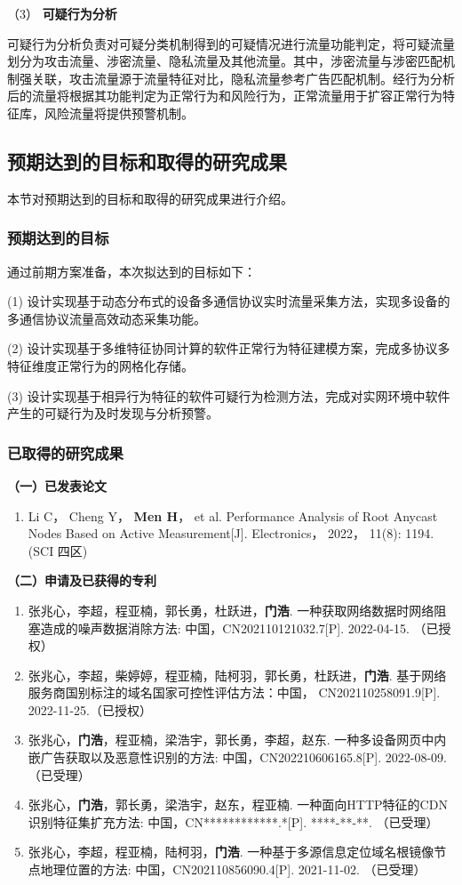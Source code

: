 （3） \textbf{可疑行为分析}\quad

可疑行为分析负责对可疑分类机制得到的可疑情况进行流量功能判定，将可疑流量划分为攻击流量、涉密流量、隐私流量及其他流量。其中，涉密流量与涉密匹配机制强关联，攻击流量源于流量特征对比，隐私流量参考广告匹配机制。经行为分析后的流量将根据其功能判定为正常行为和风险行为，正常流量用于扩容正常行为特征库，风险流量将提供预警机制。

\FloatBarrier
\subsection{预期达到的目标和取得的研究成果}
本节对预期达到的目标和取得的研究成果进行介绍。
\subsubsection{预期达到的目标}

通过前期方案准备，本次拟达到的目标如下：

(1) 设计实现基于动态分布式的设备多通信协议实时流量采集方法，实现多设备的多通信协议流量高效动态采集功能。

(2) 设计实现基于多维特征协同计算的软件正常行为特征建模方案，完成多协议多特征维度正常行为的网格化存储。

(3) 设计实现基于相异行为特征的软件可疑行为检测方法，完成对实网环境中软件产生的可疑行为及时发现与分析预警。

\subsubsection{已取得的研究成果}

	\noindent\textbf{（一）已发表论文}
	\begin{enumerate}
	\item Li C， Cheng Y， \textbf{Men H}， et al. Performance Analysis of Root Anycast Nodes Based on Active Measurement[J]. Electronics， 2022， 11(8): 1194. \quad (SCI 四区)
\end{enumerate}
\noindent\textbf{（二）申请及已获得的专利}
\begin{enumerate}
\item 张兆心，李超，程亚楠，郭长勇，杜跃进，\textbf{门浩}. 一种获取网络数据时网络阻塞造成的噪声数据消除方法: 中国，CN202110121032.7[P]. 2022-04-15. （已授权）
\item 张兆心，李超，柴婷婷，程亚楠，陆柯羽，郭长勇，杜跃进，\textbf{门浩}. 基于网络服务商国别标注的域名国家可控性评估方法：中国， CN202110258091.9[P]. 2022-11-25.（已授权） 
\item 张兆心，\textbf{门浩}，程亚楠，梁浩宇，郭长勇，李超，赵东. 一种多设备网页中内嵌广告获取以及恶意性识别的方法: 中国，CN202210606165.8[P]. 2022-08-09. （已受理）
\item 张兆心，\textbf{门浩}，郭长勇，梁浩宇，赵东，程亚楠. 一种面向HTTP特征的CDN识别特征集扩充方法: 中国，CN************.*[P]. ****-**-**. （已受理）
\item 张兆心，李超，程亚楠，陆柯羽，\textbf{门浩}. 一种基于多源信息定位域名根镜像节点地理位置的方法: 中国，CN202110856090.4[P]. 2021-11-02. （已受理）
\end{enumerate}


